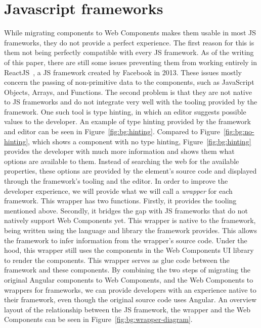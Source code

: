 \section{Javascript frameworks}\label{sec:bg:jsframeworks}
While migrating components to Web Components makes them usable in most JS frameworks, they do not provide a perfect experience. The first reason for this is them not being perfectly compatible with every JS framework. As of the writing of this paper, there are still some issues preventing them from working entirely in ReactJS~, a JS framework created by Facebook in 2013. These issues mostly concern the passing of non-primitive data to the components, such as JavaScript Objects, Arrays, and Functions. The second problem is that they are not native to JS frameworks and do not integrate very well with the tooling provided by the framework. One such tool is type hinting, in which an editor suggests possible values to the developer. An example of type hinting provided by the framework and editor can be seen in Figure~\ref{fig:bg:hinting}. Compared to Figure~\ref{fig:bg:no-hinting}, which shows a component with no type hinting, Figure~\ref{fig:bg:hinting} provides the developer with much more information and shows them what options are available to them. Instead of searching the web for the available properties, these options are provided by the element's source code and displayed through the framework's tooling and the editor. In order to improve the developer experience, we will provide what we will call a \emph{wrapper} for each framework. This wrapper has two functions. Firstly, it provides the tooling mentioned above. Secondly, it bridges the gap with JS frameworks that do not natively support Web Components yet. This wrapper is native to the framework, being written using the language and library the framework provides. This allows the framework to infer information from the wrapper's source code. Under the hood, this wrapper still uses the components in the Web Components UI library to render the components. This wrapper serves as glue code between the framework and these components. By combining the two steps of migrating the original Angular components to Web Components, and the Web Components to wrappers for frameworks, we can provide developers with an experience native to their framework, even though the original source code uses Angular. An overview layout of the relationship between the JS framework, the wrapper and the Web Components can be seen in Figure~\ref{fig:bg:wrapper-diagram}.


